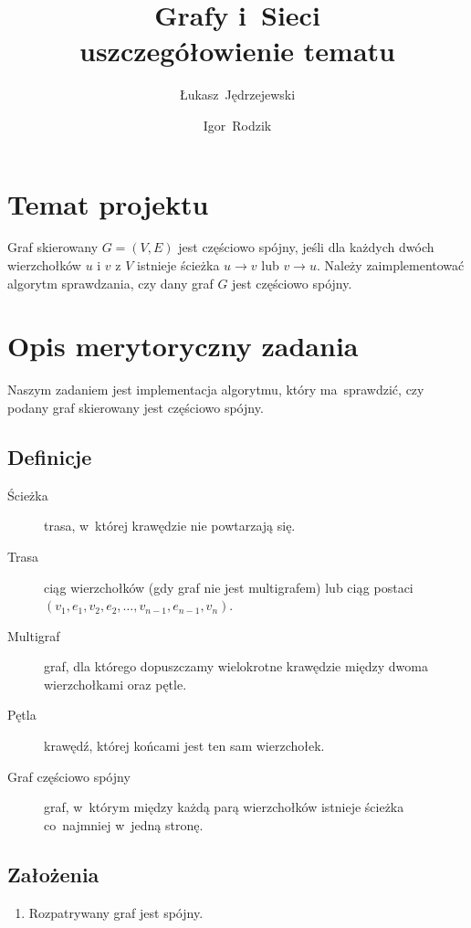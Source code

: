\documentclass[a4paper,12pt]{mwart}
\title{
    Grafy i~Sieci \\
    uszczegółowienie tematu
}
\author{
    Łukasz~Jędrzejewski
    \and
    Igor~Rodzik
}
\date{}
\begin{document}
\maketitle

\section{Temat projektu}

Graf skierowany $G=(V,E)$ jest częściowo spójny, jeśli dla każdych dwóch
wierzchołków $u$ i $v$ z $V$ istnieje ścieżka $u \to v$ lub $v \to u$. Należy
zaimplementować algorytm sprawdzania, czy dany graf $G$ jest częściowo spójny.

\section{Opis merytoryczny zadania}

Naszym zadaniem jest implementacja algorytmu, który ma~sprawdzić, czy podany
graf skierowany jest częściowo spójny.

\subsection{Definicje}

\begin{description}
\item[Ścieżka] trasa, w~której krawędzie nie powtarzają się.
\item[Trasa] ciąg wierzchołków (gdy graf nie jest multigrafem) lub ciąg
  postaci $(v_1,e_1,v_2,e_2,\ldots, v_{n-1}, e_{n-1}, v_n)$.
\item[Multigraf] graf, dla którego dopuszczamy wielokrotne krawędzie między
  dwoma wierzchołkami oraz pętle.
\item[Pętla] krawędź, której końcami jest ten sam wierzchołek.
\item[Graf częściowo spójny] graf, w~którym między każdą parą wierzchołków
  istnieje ścieżka co~najmniej w~jedną stronę.
\end{description}

\subsection{Założenia}

\begin{enumerate}
\item Rozpatrywany graf jest spójny.
\end{enumerate}
\end{document}
